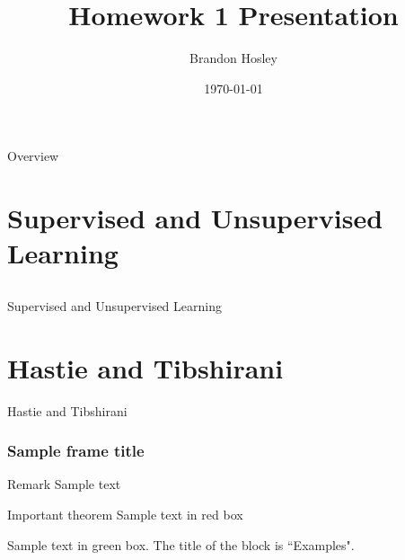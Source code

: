 \documentclass{beamer}
\title{Homework 1 Presentation}
\author{Brandon Hosley}
\institute{University of Illinois - Springfield}
\date{\today}
\begin{document}
\frame{\titlepage}

\begin{frame}{Overview}
\tableofcontents
\end{frame}

\section{Supervised and Unsupervised Learning}
\subsection{}
\begin{frame}{Supervised and Unsupervised Learning}

\end{frame}

\section{Hastie and Tibshirani}

\begin{frame}{Hastie and Tibshirani}

\end{frame}

\begin{frame}
\frametitle{Sample frame title}
\begin{block}{Remark}
	Sample text
\end{block}

\begin{alertblock}{Important theorem}
	Sample text in red box
\end{alertblock}

\begin{examples}
	Sample text in green box. The title of the block is ``Examples".
\end{examples}

\end{frame}
\end{document}
